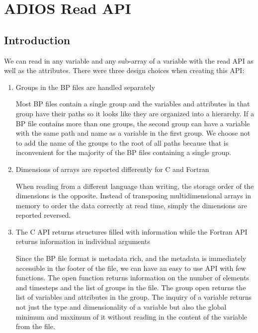 \chapter{ADIOS Read API}

\section{Introduction}

We can read in any variable and any sub-array of a variable with the read API as 
well as the attributes. There were three design choices when creating this API:

\begin{enumerate}
\item Groups in the BP files are handled separately

Most BP files contain a single group and the variables and attributes in that group 
have their paths so it looks like they are organized into a hierarchy. If a BP 
file contains more than one groups, the second group can have a variable with the 
same path and name as a variable in the first group. We choose not to add the name 
of the groups to the root of all paths because that is inconvenient for the majority 
of the BP files containing a single group.

\item Dimensions of arrays are reported differently for C and Fortran

When reading from a different language than writing, the storage order of the dimensions 
is the opposite. Instead of transposing multidimensional arrays in memory to order 
the data correctly at read time, simply the dimensions are reported reversed. 

\item The C API returns structures filled with information while the Fortran API returns 
information in individual arguments

Since the BP file format is metadata rich, and the metadata is immediately accessible 
in the footer of the file, we can have an easy to use API with few functions. The 
open function returns information on the number of elements and timesteps and the 
list of groups in the file. The group open returns the list of variables and attributes 
in the group. The inquiry of a variable returns not just the type and dimensionality 
of a variable but also the global minimum and maximum of it without reading in 
the content of the variable from the file. 
\end{enumerate}

